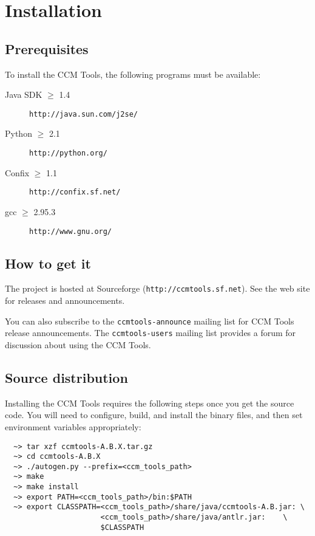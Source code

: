 
\chapter{Installation}

\section{Prerequisites}

To install the CCM Tools, the following programs must be available:
\begin{description}
\item [Java SDK $\ge$ 1.4] {\tt http://java.sun.com/j2se/}
\item [Python $\ge$ 2.1] {\tt http://python.org/}
\item [Confix $\ge$ 1.1] {\tt http://confix.sf.net/}
\item [gcc $\ge$ 2.95.3] {\tt http://www.gnu.org/}
\end{description}

\section{How to get it}

The project is hosted at Sourceforge ({\tt http://ccmtools.sf.net}). See the web
site for releases and announcements.

You can also subscribe to the {\tt ccmtools-announce} mailing list for CCM Tools
release announcements. The {\tt ccmtools-users} mailing list provides a forum
for discussion about using the CCM Tools.

\section{Source distribution}

Installing the CCM Tools requires the following steps once you get the source
code. You will need to configure, build, and install the binary files, and then
set environment variables appropriately:
\begin{small}
\begin{verbatim}
  ~> tar xzf ccmtools-A.B.X.tar.gz
  ~> cd ccmtools-A.B.X
  ~> ./autogen.py --prefix=<ccm_tools_path>
  ~> make
  ~> make install
  ~> export PATH=<ccm_tools_path>/bin:$PATH
  ~> export CLASSPATH=<ccm_tools_path>/share/java/ccmtools-A.B.jar: \
                      <ccm_tools_path>/share/java/antlr.jar:    \
                      $CLASSPATH
\end{verbatim}
\end{small}

